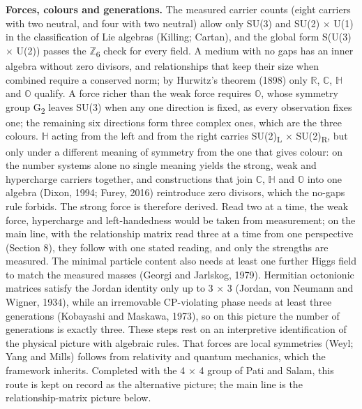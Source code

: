 \documentclass[
  11pt,
]{article}
\begin{document}
\textbf{Forces, colours and generations.} The measured carrier counts (eight carriers with two neutral, and four with two neutral) allow only SU(3) and SU(2) \ensuremath{\times} U(1) in the classification of Lie algebras (Killing; Cartan), and the global form S(U(3) \ensuremath{\times} U(2)) passes the \ensuremath{\mathbb{Z}}\textsubscript{6} check for every field. A medium with no gaps has an inner algebra without zero divisors, and relationships that keep their size when combined require a conserved norm; by Hurwitz's theorem (1898) only \ensuremath{\mathbb{R}}, \ensuremath{\mathbb{C}}, \ensuremath{\mathbb{H}} and \ensuremath{\mathbb{O}} qualify. A force richer than the weak force requires \ensuremath{\mathbb{O}}, whose symmetry group G\textsubscript{2} leaves SU(3) when any one direction is fixed, as every observation fixes one; the remaining six directions form three complex ones, which are the three colours. \ensuremath{\mathbb{H}} acting from the left and from the right carries SU(2)\textsubscript{L} \ensuremath{\times} SU(2)\textsubscript{R}, but only under a different meaning of symmetry from the one that gives colour: on the number systems alone no single meaning yields the strong, weak and hypercharge carriers together, and constructions that join \ensuremath{\mathbb{C}}, \ensuremath{\mathbb{H}} and \ensuremath{\mathbb{O}} into one algebra (Dixon, 1994; Furey, 2016) reintroduce zero divisors, which the no-gaps rule forbids. The strong force is therefore derived. Read two at a time, the weak force, hypercharge and left-handedness would be taken from measurement; on the main line, with the relationship matrix read three at a time from one perspective (Section 8), they follow with one stated reading, and only the strengths are measured. The minimal particle content also needs at least one further Higgs field to match the measured masses (Georgi and Jarlskog, 1979). Hermitian octonionic matrices satisfy the Jordan identity only up to 3 \ensuremath{\times} 3 (Jordan, von Neumann and Wigner, 1934), while an irremovable CP-violating phase needs at least three generations (Kobayashi and Maskawa, 1973), so on this picture the number of generations is exactly three. These steps rest on an interpretive identification of the physical picture with algebraic rules. That forces are local symmetries (Weyl; Yang and Mills) follows from relativity and quantum mechanics, which the framework inherits. Completed with the 4 \ensuremath{\times} 4 group of Pati and Salam, this route is kept on record as the alternative picture; the main line is the relationship-matrix picture below.
\end{document}
